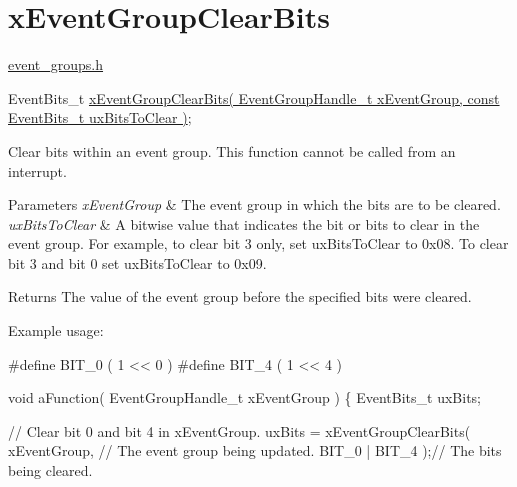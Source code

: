 \hypertarget{group__x_event_group_clear_bits}{}\section{x\+Event\+Group\+Clear\+Bits}
\label{group__x_event_group_clear_bits}
\hyperlink{event__groups_8h}{event\+\_\+groups.\+h} 
\begin{DoxyPre}
   EventBits\_t \hyperlink{event__groups_8h_a0fb72cfdd4f0d5f86d955fc3af448f2a}{xEventGroupClearBits( EventGroupHandle\_t xEventGroup, const EventBits\_t uxBitsToClear )};
\end{DoxyPre}


Clear bits within an event group. This function cannot be called from an interrupt.


\begin{DoxyParams}{Parameters}
{\em x\+Event\+Group} & The event group in which the bits are to be cleared.\\
\hline
{\em ux\+Bits\+To\+Clear} & A bitwise value that indicates the bit or bits to clear in the event group. For example, to clear bit 3 only, set ux\+Bits\+To\+Clear to 0x08. To clear bit 3 and bit 0 set ux\+Bits\+To\+Clear to 0x09.\\
\hline
\end{DoxyParams}
\begin{DoxyReturn}{Returns}
The value of the event group before the specified bits were cleared.
\end{DoxyReturn}
Example usage\+: 
\begin{DoxyPre}
  #define BIT\_0 ( 1 << 0 )
  #define BIT\_4 ( 1 << 4 )\end{DoxyPre}



\begin{DoxyPre}  void aFunction( EventGroupHandle\_t xEventGroup )
  \{
  EventBits\_t uxBits;\end{DoxyPre}



\begin{DoxyPre}    // Clear bit 0 and bit 4 in xEventGroup.
    uxBits = xEventGroupClearBits(
                            xEventGroup,    // The event group being updated.
                            BIT\_0 | BIT\_4 );// The bits being cleared.\end{DoxyPre}



